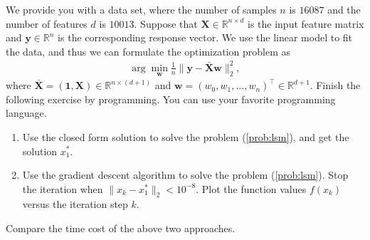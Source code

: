 \documentclass[11pt,letter,notitlepage]{article}
\begin{document}
\begin{exercise}
    We provide you with a data set, where the number of samples $n$ is $16087$ and the number of features $d$ is $10013$. Suppose that $\textbf{X}\in\mathbb{R}^{n\times d}$ is the input feature matrix and $\textbf{y}\in\mathbb{R}^n$ is the corresponding response vector. We use the linear model to fit the data, and thus we can formulate the optimization problem as 
    \begin{align}\label{prob:lsm}
        \arg\min_{\textbf{w}} \frac{1}{n}\|\textbf{y}-\bar{\textbf{X}}\textbf{w}\|_2^2,
    \end{align}
    where $\bar{\textbf{X}}=(\textbf{1},\textbf{X})\in\mathbb{R}^{n\times(d+1)}$ and $\textbf{w}=(w_0,w_1,\dots,w_n)^\top\in\mathbb{R}^{d+1}$.
    Finish the following exercise by programming. You can use your favorite programming language.
    \begin{enumerate}
        \item Use the closed form solution to solve the problem (\ref{prob:lsm}), and get the solution $x_1^*$.
        \item Use the gradient descent algorithm to solve the problem (\ref{prob:lsm}). Stop the iteration when $\|x_k-x_1^*\|_2<10^{-8}$. Plot the function values $f(x_k)$ versus the iteration step $k$. 
    \end{enumerate}
    Compare the time cost of the above two approaches.
    
\end{exercise}
\end{document}
